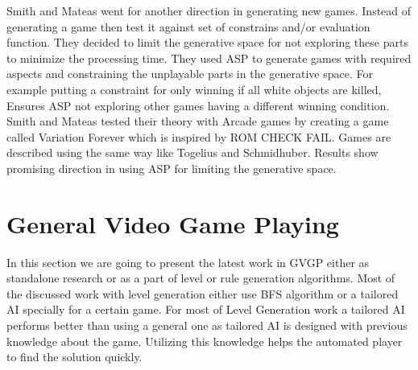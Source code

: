 Smith and Mateas\cite{variationForever} went for another direction in generating new games. Instead of generating a game then test it against set of constrains and/or evaluation function. They decided to limit the generative space for not exploring these parts to minimize the processing time. They used ASP to generate games with required aspects and constraining the unplayable parts in the generative space. For example putting a constraint for only winning if all white objects are killed, Ensures ASP not exploring other games having a different winning condition. Smith and Mateas tested their theory with Arcade games by creating a game called Variation Forever\cite{variationForeverGame} which is inspired by ROM CHECK FAIL\cite{romCheckFail}. Games are described using the same way like Togelius and Schmidhuber\cite{arcadeHillClimber}. Results show promising direction in using ASP for limiting the generative space.

\section{General Video Game Playing}
In this section we are going to present the latest work in GVGP either as standalone research or as a part of level or rule generation algorithms. Most of the discussed work with level generation either use BFS algorithm\cite{sokobanLevelGenerationOld} or a tailored AI specially for a certain game\cite{ctrSimulationApproach}. For most of Level Generation work a tailored AI performs better than using a general one as tailored AI is designed with previous knowledge about the game. Utilizing this knowledge helps the automated player to find the solution quickly.\\\par

